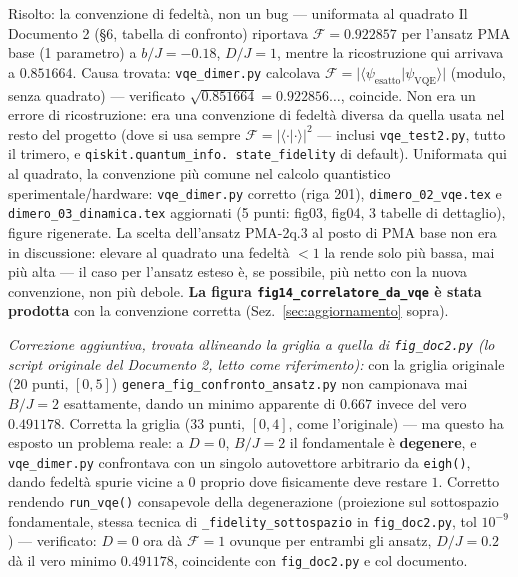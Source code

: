 \documentclass[11pt,a4paper]{article}
\newcommand{\code}[1]{\texttt{\small #1}}
\begin{document}
\begin{okbox}{Risolto: la convenzione di fedeltà, non un bug --- uniformata al quadrato}
Il Documento 2 (\S6, tabella di confronto) riportava $\mathcal F=0.922857$
per l'ansatz PMA base (1 parametro) a $b/J=-0.18$, $D/J=1$, mentre la
ricostruzione qui arrivava a $0.851664$. Causa trovata: \code{vqe\_dimer.py}
calcolava $\mathcal F=\lvert\langle\psi_\text{esatto}\rvert\psi_\text{VQE}\rangle\rvert$
(modulo, senza quadrato) --- verificato $\sqrt{0.851664}=0.922856\ldots$,
coincide. Non era un errore di ricostruzione: era una convenzione di
fedeltà diversa da quella usata nel resto del progetto (dove si usa sempre
$\mathcal F=\lvert\langle\cdot\rvert\cdot\rangle\rvert^2$ --- inclusi
\code{vqe\_test2.py}, tutto il trimero, e \code{qiskit.quantum\_info.
state\_fidelity} di default). Uniformata qui al quadrato, la convenzione
più comune nel calcolo quantistico sperimentale/hardware: \code{vqe\_dimer.py}
corretto (riga 201), \code{dimero\_02\_vqe.tex} e \code{dimero\_03\_dinamica.tex}
aggiornati (5 punti: fig03, fig04, 3 tabelle di dettaglio), figure
rigenerate. La scelta dell'ansatz PMA-2q.3 al posto di PMA base non era in
discussione: elevare al quadrato una fedeltà $<1$ la rende solo più bassa,
mai più alta --- il caso per l'ansatz esteso è, se possibile, più netto con
la nuova convenzione, non più debole. \textbf{La figura
\code{fig14\_correlatore\_da\_vqe} è stata prodotta} con la convenzione
corretta (Sez.~\ref{sec:aggiornamento} sopra).

\textit{Correzione aggiuntiva, trovata allineando la griglia a quella di
\code{fig\_doc2.py} (lo script originale del Documento 2, letto come
riferimento):} con la griglia originale (20 punti, $[0,5]$)
\code{genera\_fig\_confronto\_ansatz.py} non campionava mai $B/J=2$
esattamente, dando un minimo apparente di $0.667$ invece del vero
$0.491178$. Corretta la griglia (33 punti, $[0,4]$, come l'originale) ---
ma questo ha esposto un problema reale: a $D=0$, $B/J=2$ il fondamentale è
\textbf{degenere}, e \code{vqe\_dimer.py} confrontava con un singolo
autovettore arbitrario da \code{eigh()}, dando fedeltà spurie vicine a
$0$ proprio dove fisicamente deve restare $1$. Corretto rendendo
\code{run\_vqe()} consapevole della degenerazione (proiezione sul
sottospazio fondamentale, stessa tecnica di \code{\_fidelity\_sottospazio}
in \code{fig\_doc2.py}, tol $10^{-9}$) --- verificato: $D=0$ ora dà
$\mathcal F=1$ ovunque per entrambi gli ansatz, $D/J=0.2$ dà il vero
minimo $0.491178$, coincidente con \code{fig\_doc2.py} e col documento.
\end{okbox}
\end{document}
